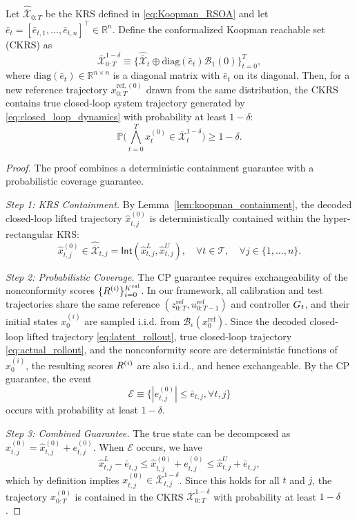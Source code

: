 \setcounter{theorem}{0}
\begin{theorem}
\label{thm:ckrs_coverage}
Let $\hat{\overline{\mathcal{X}}}_{0:T}$ be the KRS defined in \eqref{eq:Koopman_RSOA} and let $\bar e_t = [\bar e_{t,1}, \ldots, \bar e_{t,n}]^\top \in \mathbb{R}^n$. Define the conformalized Koopman reachable set (CKRS) as
\begin{equation}
\overline{\mathcal{X}}_{0:T}^{1-\delta} \equiv \bigl\{ \hat{\overline{\mathcal{X}}}_t \oplus \mathrm{diag}(\bar e_t) \mathcal{B}_1(0) \bigr\}_{t=0}^T,
\label{eq:conformal_inflation}
\end{equation}
where $\mathrm{diag}(\bar e_t) \in \mathbb{R}^{n\times n}$ is a diagonal matrix with $\bar e_t$ on its diagonal. Then, for a new reference trajectory $x_{0:T}^{\textrm{ref}, (0)}$ drawn from the same distribution, the CKRS contains true closed-loop system trajectory generated by \eqref{eq:closed_loop_dynamics} with probability at least $1-\delta$:
\[
\mathbb{P}\Big( \bigwedge_{t=0}^T x_t^{(0)} \in \overline{\mathcal{X}}_t^{1-\delta} \Big) \ge 1-\delta.
\]
\end{theorem}

\begin{proof}
The proof combines a deterministic containment guarantee with a probabilistic coverage guarantee.

\noindent\textit{Step 1: KRS Containment.}  
By Lemma~\ref{lem:koopman_containment}, the decoded closed-loop lifted trajectory $\hat{x}_{t,j}^{(0)}$ is deterministically contained within the hyper-rectangular KRS:
\[
\hat{x}_{t,j}^{(0)} \in \hat{\overline{\mathcal{X}}}_{t,j} = \textsf{Int}(\hat{x}_{t,j}^L, \hat{x}_{t,j}^U), \quad \forall t \in \mathcal{T},\quad \forall j \in \{1,\ldots,n\}.
\]

\noindent\textit{Step 2: Probabilistic Coverage.}  
The CP guarantee requires exchangeability of the nonconformity scores $\{R^{(i)}\}_{i=0}^{K^{\mathrm{cal}}}$. In our framework, all calibration and test trajectories share the same reference $(z_{0:T}^{\mathrm{ref}}, u_{0:T-1}^{\mathrm{ref}})$ and controller $G_t$, and their initial states $x_0^{(i)}$ are sampled i.i.d. from $\mathcal{B}_\epsilon(x_0^{\mathrm{ref}})$. Since the decoded closed-loop lifted trajectory \eqref{eq:latent_rollout}, true closed-loop trajectory \eqref{eq:actual_rollout}, and the nonconformity score are deterministic functions of $x_0^{(i)}$, the resulting scores $R^{(i)}$ are also i.i.d., and hence exchangeable. By the CP guarantee, the event
\[
\mathcal{E} \equiv \{ |e_{t,j}^{(0)}| \le \bar e_{t,j}, \forall t,j \}
\]
occurs with probability at least $1-\delta$.

\noindent\textit{Step 3: Combined Guarantee.}  
The true state can be decomposed as $x_{t,j}^{(0)} = \hat{x}_{t,j}^{(0)} + e_{t,j}^{(0)}$. When $\mathcal{E}$ occurs, we have
\[
\hat{x}_{t,j}^L - \bar e_{t,j} \le \hat{x}_{t,j}^{(0)} + e_{t,j}^{(0)} \le \hat{x}_{t,j}^U + \bar e_{t,j},
\]
which by definition implies $x_{t,j}^{(0)} \in \overline{\mathcal{X}}_{t,j}^{1-\delta}$. Since this holds for all $t$ and $j$, the trajectory $x_{0:T}^{(0)}$ is contained in the CKRS $\overline{\mathcal{X}}_{0:T}^{1-\delta}$ with probability at least $1-\delta$.
\end{proof}

